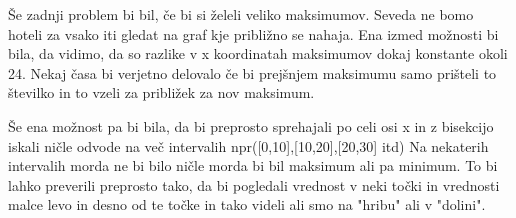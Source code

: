 \documentclass{article}
\begin{document}
Še zadnji problem bi bil, če bi si želeli veliko maksimumov. Seveda ne bomo hoteli za vsako iti gledat na graf kje približno se nahaja. 
Ena izmed možnosti bi bila, da vidimo, da so razlike v x koordinatah maksimumov dokaj konstante okoli 24. Nekaj časa bi verjetno delovalo če bi prejšnjem maksimumu samo prišteli to številko in to vzeli za približek za nov maksimum.

Še ena možnost pa bi bila, da bi preprosto sprehajali po celi osi x in z bisekcijo iskali ničle odvode na več intervalih npr([0,10],[10,20],[20,30] itd) Na nekaterih intervalih morda ne bi bilo ničle morda bi bil maksimum ali pa minimum. To bi lahko preverili preprosto tako, da bi pogledali vrednost v neki točki in vrednosti malce levo in desno od te točke in tako videli ali smo na "hribu" ali v "dolini".
\end{document}
